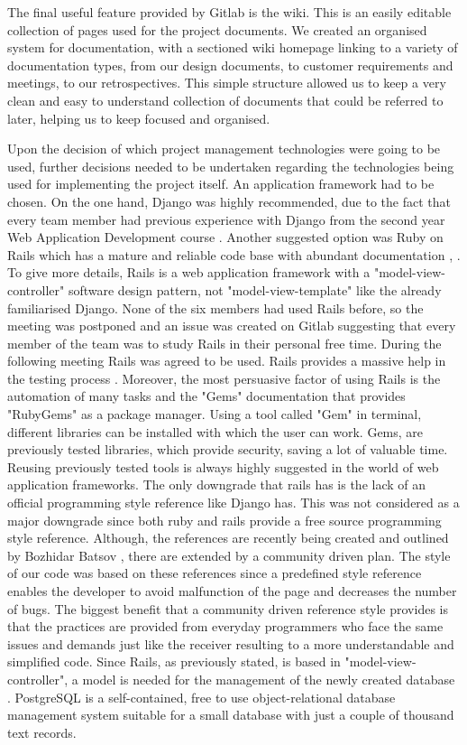 \documentclass{l3proj}
\begin{document}
The final useful feature provided by Gitlab is the wiki. This is an easily editable collection of pages used for the project documents. We created an organised system for documentation, with a sectioned wiki homepage linking to a variety of documentation types, from our design documents, to customer requirements and meetings, to our retrospectives. This simple structure allowed us to keep a very clean and easy to understand collection of documents that could be referred to later, helping us to keep focused and organised.

Upon the decision of which project management technologies were going to be used, further decisions needed to be undertaken regarding the technologies being used for implementing the project itself. An application framework had to be chosen. On the one hand, Django was highly recommended, due to the fact that every team member had previous experience with Django from the second year Web Application Development course \cite{Django}. Another suggested option was Ruby on Rails which has a mature and reliable code base with abundant documentation \cite{Rails}, \cite{DjangoVsRails}. To give more details, Rails is a web application framework with a "model-view-controller" software design pattern, not "model-view-template" like the already familiarised Django. None of the six members had used Rails before, so the meeting was postponed and an issue was created on Gitlab suggesting that every member of the team was to study Rails in their personal free time. During the following meeting Rails was agreed to be used. Rails provides a massive help in the testing process \cite{RubyGem} . Moreover, the most persuasive factor of using Rails is the automation of many tasks and the "Gems" documentation that provides "RubyGems" as a package manager. Using a tool called "Gem" in terminal, different libraries can be installed with which the user can work. Gems, are previously tested libraries, which provide security, saving a lot of valuable time. Reusing previously tested tools is always highly suggested in the world of web application frameworks. The only downgrade that rails has is the lack of an official programming style reference like Django has. This was not considered as a major downgrade since both ruby \cite{rubyStyle} and rails \cite{railsStyle} provide a free source programming style reference. Although, the references are recently being created and outlined by Bozhidar Batsov \cite{batsov}, there are extended by a community driven plan. The style of our code was based on these references since a predefined style reference enables the developer to avoid malfunction of the page and decreases the number of bugs. The biggest benefit that a community driven reference style provides is that the practices are provided from everyday programmers who face the same issues and demands just like the receiver resulting to a more understandable and simplified code. Since Rails, as previously stated, is based in "model-view-controller", a model is needed for the management of the newly created database \cite{PostgreSQL}. PostgreSQL is a self-contained, free to use object-relational database management system suitable for a small database with just a couple of thousand text records.
\end{document}
